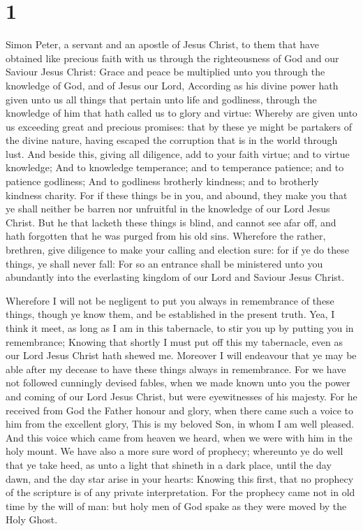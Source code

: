 \hypertarget{section}{%
\section{1}\label{section}}

 Simon Peter, a servant and an apostle of Jesus Christ, to
them that have obtained like precious faith with us through the
righteousness of God and our Saviour Jesus Christ:  Grace
and peace be multiplied unto you through the knowledge of God, and of
Jesus our Lord,  According as his divine power hath given
unto us all things that pertain unto life and godliness, through the
knowledge of him that hath called us to glory and virtue: 
Whereby are given unto us exceeding great and precious promises: that by
these ye might be partakers of the divine nature, having escaped the
corruption that is in the world through lust.  And beside
this, giving all diligence, add to your faith virtue; and to virtue
knowledge;  And to knowledge temperance; and to temperance
patience; and to patience godliness;  And to godliness
brotherly kindness; and to brotherly kindness charity.  For
if these things be in you, and abound, they make you that ye shall
neither be barren nor unfruitful in the knowledge of our Lord Jesus
Christ.  But he that lacketh these things is blind, and
cannot see afar off, and hath forgotten that he was purged from his old
sins.  Wherefore the rather, brethren, give diligence to
make your calling and election sure: for if ye do these things, ye shall
never fall:  For so an entrance shall be ministered unto
you abundantly into the everlasting kingdom of our Lord and Saviour
Jesus Christ.

 Wherefore I will not be negligent to put you always in
remembrance of these things, though ye know them, and be established in
the present truth.  Yea, I think it meet, as long as I am
in this tabernacle, to stir you up by putting you in remembrance;
 Knowing that shortly I must put off this my tabernacle,
even as our Lord Jesus Christ hath shewed me.  Moreover I
will endeavour that ye may be able after my decease to have these things
always in remembrance.  For we have not followed cunningly
devised fables, when we made known unto you the power and coming of our
Lord Jesus Christ, but were eyewitnesses of his majesty. 
For he received from God the Father honour and glory, when there came
such a voice to him from the excellent glory, This is my beloved Son, in
whom I am well pleased.  And this voice which came from
heaven we heard, when we were with him in the holy mount. 
We have also a more sure word of prophecy; whereunto ye do well that ye
take heed, as unto a light that shineth in a dark place, until the day
dawn, and the day star arise in your hearts:  Knowing this
first, that no prophecy of the scripture is of any private
interpretation.  For the prophecy came not in old time by
the will of man: but holy men of God spake as they were moved by the
Holy Ghost.

